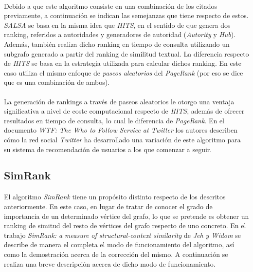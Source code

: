 \documentclass{subfiles}
\begin{document}
        \paragraph{}
        Debido a que este algoritmo consiste en una combinación de los citados previamente, a continuación se indican las semejanzas que tiene respecto de estos. \emph{SALSA} se basa en la misma idea que \emph{HITS}, en el sentido de que genera dos ranking, referidos a autoridades y generadores de autoridad (\emph{Autority} y \emph{Hub}). Además, también realiza dicho ranking en tiempo de consulta utilizando un subgrafo generado a partir del ranking de similitud textual. La diferencia respecto de \emph{HITS} se basa en la estrategia utilizada para calcular dichos ranking. En este caso utiliza el mismo enfoque de \emph{paseos aleatorios} del \emph{PageRank} (por eso se dice que es una combinación de ambos).

        \paragraph{}
        La generación de rankings a través de paseos aleatorios le otorgo una ventaja significativa a nivel de coste computacional respecto de \emph{HITS}, además de ofrecer resultados en tiempo de consulta, lo cual le diferencia de \emph{PageRank}. En el documento \emph{WTF: The Who to Follow Service at Twitter} \cite{gupta2013wtf} los autores describen cómo la red social \emph{Twitter} ha desarrollado una variación de este algoritmo para su sistema de recomendación de usuarios a los que comenzar a seguir.

      \subsection{SimRank}
      \label{sec:simrank}

        \paragraph{}
        El algoritmo \emph{SimRank} tiene un propósito distinto respecto de los descritos anteriormente. En este caso, en lugar de tratar de conocer el grado de importancia de un determinado vértice del grafo, lo que se pretende es obtener un ranking de simitud del resto de vértices del grafo respecto de uno concreto. En el trabajo \emph{SimRank: a measure of structural-context similarity} \cite{jeh2002simrank} de \emph{Jeh y Widom} se describe de manera el completa el modo de funcionamiento del algoritmo, así como la demostración acerca de la corrección del mismo. A continuación se realiza una breve descripción acerca de dicho modo de funcionamiento.
\end{document}
